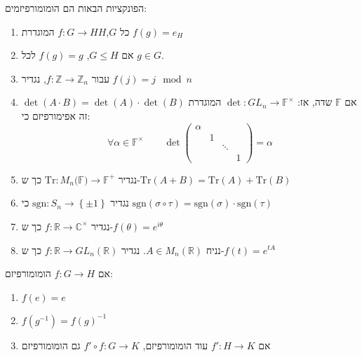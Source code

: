 \documentclass{tstextbook}
\begin{document}
\begin{example}
הפונקציות הבאות הם הומומורפיזמים:

  \begin{enumerate}
    \item כל \(G\),\(H\)\(f:G\to H\) המוגדרת \(f(g)=e_{H}\)


    \item אם \(G\leq H\), \(f(g)=g\) לכל \(g \in  G\). 


    \item עבור \(f:\mathbb{Z} \to \mathbb{Z} _n\), נגדיר \(f(j)=j\mod n\)


    \item אם \(\mathbb{F}\) שדה, אז: \(\det:GL_{n}\to \mathbb{F}^\times\) המוגדרת \(\det\left( A\cdot B \right)=\det(A)\cdot \det (B)\) זה אפימורפיזם כי: 
$$\forall \alpha \in \mathbb{F}  ^{\times}\qquad \det \left( \begin{matrix} \alpha  &  &  \\   & 1 & & \\  &  & \ddots &  \\  &  &  & 1
 \end{matrix} \right)=\alpha$$


    \item נגדיר \(\mathrm{Tr}:M_{n}(\mathbb{F)}\to \mathbb{F}^+\) כך ש-\(\mathrm{Tr}(A+B)=\mathrm{Tr}(A)+\mathrm{Tr}(B)\)


    \item נגדיר \(\mathrm{sgn}:S_{n}\to \left\{  \pm 1  \right\}\) כי \(\mathrm{sgn}\left( \sigma \circ \tau \right)=\mathrm{sgn}\left( \sigma \right)\cdot \mathrm{sgn}\left( \tau \right)\)


    \item נגדיר \(f:\mathbb{R} \to \mathbb{C} ^\times\) כך ש-\(f\left( \theta \right)=e^{i\theta}\)


    \item נניח \(A\in M_{n}\left( \mathbb{R}  \right)\). נגדיר \(f:\mathbb{R} \to GL_{n}\left( \mathbb{R}  \right)\) כך ש-\(f(t)=e^{tA}\)


  \end{enumerate}
\end{example}
\begin{proposition}
אם \(f:G\to H\) הומומורפיזם:

  \begin{enumerate}
    \item \(f(e)=e\)


    \item \(f(g^{-1} )=f(g)^{-1}\)


    \item אם \(f':H\to K\) עוד הומומורפיזם, \(f'\circ f:G\to K\) גם הומומורפיזם 


  \end{enumerate}
\end{proposition}
\end{document}
